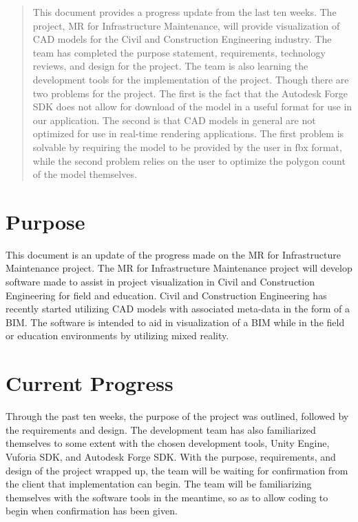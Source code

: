 \documentclass[onecolumn, draftclsnofoot,10pt, compsoc]{IEEEtran}
\begin{document}
\begin{titlepage}
\begin{singlespace}
\begin{abstract}
This document provides a progress update from the last ten weeks.
The project, MR for Infrastructure Maintenance, will provide visualization of CAD models for the Civil and Construction Engineering industry.
The team has completed the purpose statement, requirements, technology reviews, and design for the project.
The team is also learning the development tools for the implementation of the project.
Though there are two problems for the project.
The first is the fact that the Autodesk Forge SDK does not allow for download of the model in a useful format for use in our application.
The second is that CAD models in general are not optimized for use in real-time rendering applications.
The first problem is solvable by requiring the model to be provided by the user in fbx format, while the second problem relies on the user to optimize the polygon count of the model themselves.
\end{abstract}
\end{singlespace}
\end{titlepage}
\newpage

\tableofcontents
\listoftables
\clearpage

\section{Purpose}
This document is an update of the progress made on the MR for Infrastructure Maintenance project.
The MR for Infrastructure Maintenance project will develop software made to assist in project visualization in Civil and Construction Engineering for field and education.
Civil and Construction Engineering has recently started utilizing CAD models with associated meta-data in the form of a BIM.
The software is intended to aid in visualization of a BIM while in the field or education environments by utilizing mixed reality.\par

\section{Current Progress}
Through the past ten weeks, the purpose of the project was outlined, followed by the requirements and design.
The development team has also familiarized themselves to some extent with the chosen development tools, Unity Engine, Vuforia SDK, and Autodesk Forge SDK.
With the purpose, requirements, and design of the project wrapped up, the team will be waiting for confirmation from the client that implementation can begin.
The team will be familiarizing themselves with the software tools in the meantime, so as to allow coding to begin when confirmation has been given.\par
\end{document}
